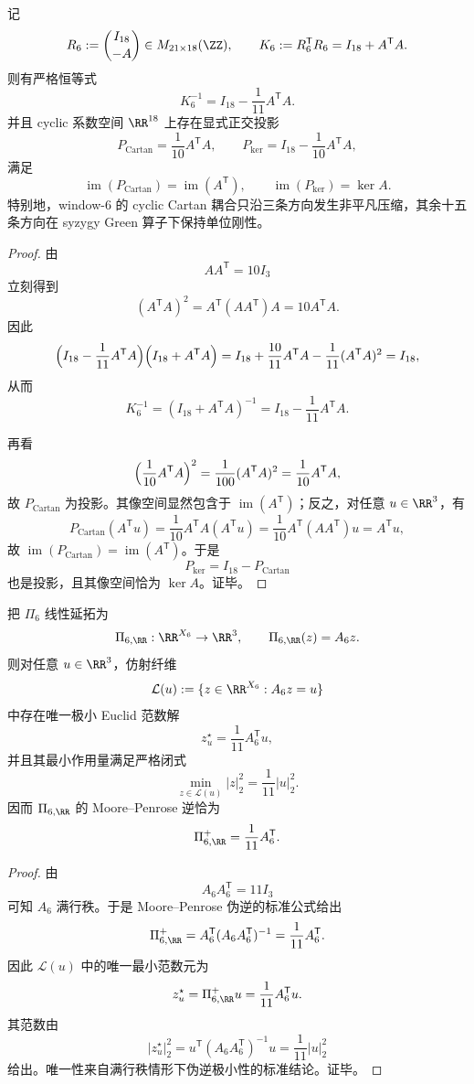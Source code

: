 \begin{theorem}\label{thm:conclusion-window6-syzygy-green-inverse-closed-form}
记
\[
R_6:=\binom{I_{18}}{-A}\in M_{21\times 18}(\ZZ),
\qquad
K_6:=R_6^{\mathsf T}R_6=I_{18}+A^{\mathsf T}A.
\]
则有严格恒等式
\[
K_6^{-1}=I_{18}-\frac{1}{11}A^{\mathsf T}A.
\]
并且 cyclic 系数空间 \(\RR^{18}\) 上存在显式正交投影
\[
P_{\mathrm{Cartan}}=\frac{1}{10}A^{\mathsf T}A,
\qquad
P_{\mathrm{ker}}=I_{18}-\frac{1}{10}A^{\mathsf T}A,
\]
满足
\[
\operatorname{im}(P_{\mathrm{Cartan}})=\operatorname{im}(A^{\mathsf T}),
\qquad
\operatorname{im}(P_{\mathrm{ker}})=\ker A.
\]
特别地，window-\(6\) 的 cyclic Cartan 耦合只沿三条方向发生非平凡压缩，其余十五条方向在 syzygy Green 算子下保持单位刚性。
\end{theorem}
\begin{proof}
由
\[
AA^{\mathsf T}=10I_3
\]
立刻得到
\[
(A^{\mathsf T}A)^2=A^{\mathsf T}(AA^{\mathsf T})A=10A^{\mathsf T}A.
\]
因此
\[
\Bigl(I_{18}-\frac{1}{11}A^{\mathsf T}A\Bigr)\Bigl(I_{18}+A^{\mathsf T}A\Bigr)
=
I_{18}+\frac{10}{11}A^{\mathsf T}A-\frac{1}{11}(A^{\mathsf T}A)^2
=
I_{18},
\]
从而
\[
K_6^{-1}=(I_{18}+A^{\mathsf T}A)^{-1}=I_{18}-\frac{1}{11}A^{\mathsf T}A.
\]

再看
\[
\Bigl(\frac{1}{10}A^{\mathsf T}A\Bigr)^2
=
\frac{1}{100}(A^{\mathsf T}A)^2
=
\frac{1}{10}A^{\mathsf T}A,
\]
故 \(P_{\mathrm{Cartan}}\) 为投影。其像空间显然包含于 \(\operatorname{im}(A^{\mathsf T})\)；反之，对任意 \(u\in\RR^3\)，有
\[
P_{\mathrm{Cartan}}(A^{\mathsf T}u)
=
\frac{1}{10}A^{\mathsf T}A(A^{\mathsf T}u)
=
\frac{1}{10}A^{\mathsf T}(AA^{\mathsf T})u
=
A^{\mathsf T}u,
\]
故 \(\operatorname{im}(P_{\mathrm{Cartan}})=\operatorname{im}(A^{\mathsf T})\)。于是
\[
P_{\mathrm{ker}}=I_{18}-P_{\mathrm{Cartan}}
\]
也是投影，且其像空间恰为 \(\ker A\)。证毕。
\end{proof}

\begin{theorem}\label{thm:conclusion-window6-cartan-charge-one-over-eleven-minimal-lift}
把 \(\Pi_6\) 线性延拓为
\[
\Pi_{6,\RR}:\RR^{X_6}\to \RR^3,
\qquad
\Pi_{6,\RR}(z)=A_6z.
\]
则对任意 \(u\in\RR^3\)，仿射纤维
\[
\mathcal L(u):=\{z\in\RR^{X_6}:A_6z=u\}
\]
中存在唯一极小 Euclid 范数解
\[
z_u^\star=\frac{1}{11}A_6^{\mathsf T}u,
\]
并且其最小作用量满足严格闭式
\[
\min_{z\in\mathcal L(u)}|z|_2^2=\frac{1}{11}|u|_2^2.
\]
因而 \(\Pi_{6,\RR}\) 的 Moore--Penrose 逆恰为
\[
\Pi_{6,\RR}^+=\frac{1}{11}A_6^{\mathsf T}.
\]
\end{theorem}
\begin{proof}
由
\[
A_6A_6^{\mathsf T}=11I_3
\]
可知 \(A_6\) 满行秩。于是 Moore--Penrose 伪逆的标准公式给出
\[
\Pi_{6,\RR}^+=A_6^{\mathsf T}(A_6A_6^{\mathsf T})^{-1}
=\frac{1}{11}A_6^{\mathsf T}.
\]
因此 \(\mathcal L(u)\) 中的唯一最小范数元为
\[
z_u^\star=\Pi_{6,\RR}^+u=\frac{1}{11}A_6^{\mathsf T}u.
\]
其范数由
\[
|z_u^\star|_2^2
=
u^{\mathsf T}(A_6A_6^{\mathsf T})^{-1}u
=
\frac{1}{11}|u|_2^2
\]
给出。唯一性来自满行秩情形下伪逆极小性的标准结论。证毕。
\end{proof}


